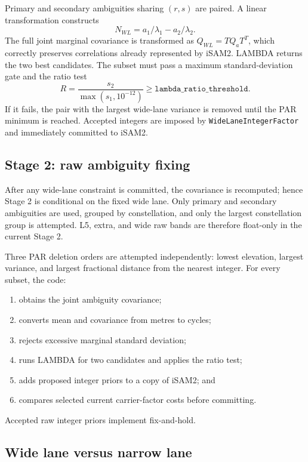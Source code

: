 \documentclass[11pt,a4paper]{article}
\newcommand{\code}[1]{\texttt{#1}}
\begin{document}
Primary and secondary ambiguities sharing $(r,s)$ are paired.  A linear
transformation constructs
\begin{equation}
N_{WL}=a_1/\lambda_1-a_2/\lambda_2.
\end{equation}
The full joint marginal covariance is transformed as $Q_{WL}=TQ_aT^T$, which
correctly preserves correlations already represented by iSAM2.  LAMBDA returns
the two best candidates.  The subset must pass a maximum standard-deviation
gate and the ratio test
\begin{equation}
R=\frac{s_2}{\max(s_1,10^{-12})}\geq
\code{lambda\_ratio\_threshold}.
\end{equation}
If it fails, the pair with the largest wide-lane variance is removed until the
PAR minimum is reached.  Accepted integers are imposed by
\code{WideLaneIntegerFactor} and immediately committed to iSAM2.

\subsection{Stage 2: raw ambiguity fixing}

After any wide-lane constraint is committed, the covariance is recomputed;
hence Stage 2 is conditional on the fixed wide lane.  Only primary and secondary
ambiguities are used, grouped by constellation, and only the largest
constellation group is attempted.  L5, extra, and wide raw bands are therefore
float-only in the current Stage 2.

Three PAR deletion orders are attempted independently: lowest elevation,
largest variance, and largest fractional distance from the nearest integer.
For every subset, the code:
\begin{enumerate}
  \item obtains the joint ambiguity covariance;
  \item converts mean and covariance from metres to cycles;
  \item rejects excessive marginal standard deviation;
  \item runs LAMBDA for two candidates and applies the ratio test;
  \item adds proposed integer priors to a copy of iSAM2; and
  \item compares selected current carrier-factor costs before committing.
\end{enumerate}
Accepted raw integer priors implement fix-and-hold.

\subsection{Wide lane versus narrow lane}
\end{document}
